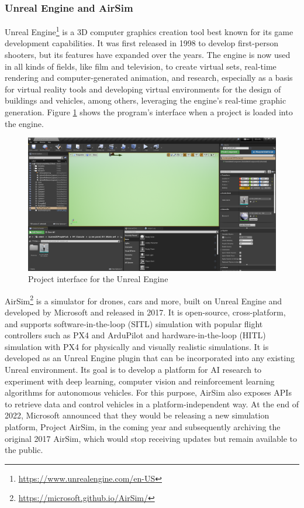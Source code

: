 \subsubsection{Unreal Engine and AirSim}
\label{subsec:unreal}

Unreal Engine\footnote{\url{https://www.unrealengine.com/en-US}} is a 3D computer graphics creation tool best known for its game development capabilities.
It was first released in 1998 to develop first-person shooters, but its features have expanded over the years.
The engine is now used in all kinds of fields, like film and television, to create virtual sets, real-time rendering and computer-generated animation, and research, especially as a basis for virtual reality tools and developing virtual environments for the design of buildings and vehicles, among others, leveraging the engine's real-time graphic generation.
Figure \ref{fig:ue-interface} shows the program's interface when a project is loaded into the engine.

\begin{figure}
  \centering
  \includegraphics[width=\textwidth,keepaspectratio]{img/ue-interface.png}
  \caption{Project interface for the Unreal Engine}\label{fig:ue-interface}
\end{figure}

AirSim\footnote{\url{https://microsoft.github.io/AirSim/}} is a simulator for drones, cars and more, built on Unreal Engine and developed by Microsoft and released in 2017.
It is open-source, cross-platform, and supports software-in-the-loop (SITL) simulation with popular flight controllers such as PX4 and ArduPilot and hardware-in-the-loop (HITL) simulation with PX4 for physically and visually realistic simulations. 
It is developed as an Unreal Engine plugin that can be incorporated into any existing Unreal environment.
Its goal is to develop a platform for AI research to experiment with deep learning, computer vision and reinforcement learning algorithms for autonomous vehicles. For this purpose, AirSim also exposes APIs to retrieve data and control vehicles in a platform-independent way.
At the end of 2022, Microsoft announced that they would be releasing a new simulation platform, Project AirSim, in the coming year and subsequently archiving the original 2017 AirSim, which would stop receiving updates but remain available to the public.

